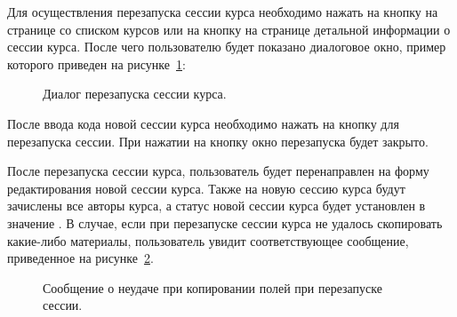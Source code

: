 Для осуществления перезапуска сессии курса необходимо нажать на кнопку  на странице со списком курсов или на кнопку  на странице детальной информации о сессии курса.
После чего пользователю будет показано диалоговое окно, пример которого приведен на рисунке~\ref{img:course_session:course_session_rerun_dialog}:
\begin{figure}[H]
	\caption{Диалог перезапуска сессии курса.}
	\label{img:course_session:course_session_rerun_dialog}
\end{figure}
После ввода кода новой сессии курса необходимо нажать на кнопку  для перезапуска сессии.
При нажатии на кнопку  окно перезапуска будет закрыто.

После перезапуска сессии курса, пользователь будет перенаправлен на форму редактирования новой сессии курса.
Также на новую сессию курса будут зачислены все авторы курса, а статус новой сессии курса будет установлен в значение .
В случае, если при перезапуске сессии курса не удалось скопировать какие-либо материалы, пользователь увидит соответствующее сообщение, приведенное на рисунке~\ref{img:course_session:course_session_rerun_warning}.
\begin{figure}[H]
	\caption{Сообщение о неудаче при копировании полей при перезапуске сессии.}
	\label{img:course_session:course_session_rerun_warning}
\end{figure}

